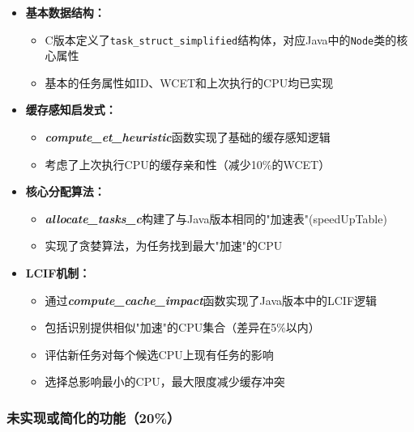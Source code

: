 \documentclass[a4paper,12pt]{article}
\begin{document}
\begin{itemize}
  \item \textbf{基本数据结构：}
   \begin{itemize}
     \item C版本定义了\texttt{task\_struct\_simplified}结构体，对应Java中的\texttt{Node}类的核心属性
     \item 基本的任务属性如ID、WCET和上次执行的CPU均已实现
   \end{itemize}

  \item \textbf{缓存感知启发式：}
   \begin{itemize}
     \item \textit{\textbf{compute\_et\_heuristic}}函数实现了基础的缓存感知逻辑
     \item 考虑了上次执行CPU的缓存亲和性（减少10\%的WCET）
   \end{itemize}

  \item \textbf{核心分配算法：}
   \begin{itemize}
     \item \textit{\textbf{allocate\_tasks\_c}}构建了与Java版本相同的"加速表"(speedUpTable)
     \item 实现了贪婪算法，为任务找到最大"加速"的CPU
   \end{itemize}
   
  \item \textbf{LCIF机制：}
   \begin{itemize}
     \item 通过\textit{\textbf{compute\_cache\_impact}}函数实现了Java版本中的LCIF逻辑
     \item 包括识别提供相似"加速"的CPU集合（差异在5\%以内）
     \item 评估新任务对每个候选CPU上现有任务的影响
     \item 选择总影响最小的CPU，最大限度减少缓存冲突
   \end{itemize}
\end{itemize}

\subsubsection{未实现或简化的功能（20\%）}
\end{document}
